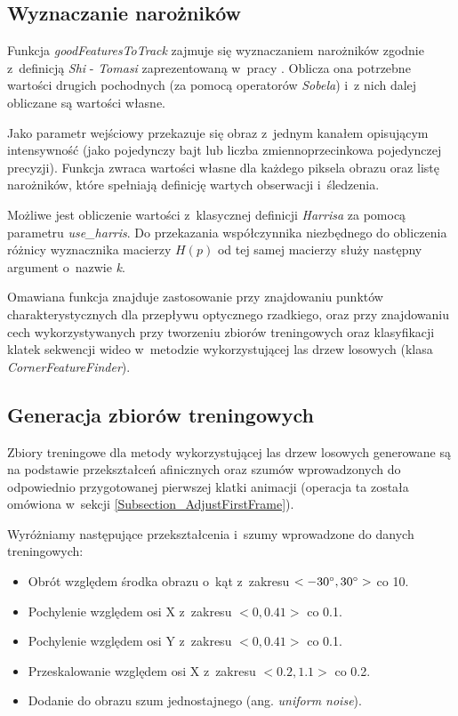   \subsection{Wyznaczanie narożników}
  Funkcja \textit{goodFeaturesToTrack} zajmuje się wyznaczaniem narożników zgodnie z~definicją \textit{Shi} - \textit{Tomasi} zaprezentowaną w~pracy \cite{GoodFeaturesToTrack94}. Oblicza ona potrzebne wartości drugich pochodnych (za pomocą operatorów \textit{Sobela}) i~z nich dalej obliczane są wartości własne.

  Jako parametr wejściowy przekazuje się obraz z~jednym kanałem opisującym intensywność (jako pojedynczy bajt lub liczba zmiennoprzecinkowa pojedynczej precyzji). Funkcja zwraca wartości własne dla każdego piksela obrazu oraz listę narożników, które spełniają definicję wartych obserwacji i~śledzenia.

  Możliwe jest obliczenie wartości z~klasycznej definicji \textit{Harrisa} za pomocą parametru \textit{use\_harris}. Do przekazania współczynnika niezbędnego do obliczenia różnicy wyznacznika macierzy $H(p)$ od tej samej macierzy służy następny argument o~nazwie \textit{k}.

  Omawiana funkcja znajduje zastosowanie przy znajdowaniu punktów charakterystycznych dla przepływu optycznego rzadkiego, oraz przy znajdowaniu cech wykorzystywanych przy tworzeniu zbiorów treningowych oraz klasyfikacji klatek sekwencji wideo w~metodzie wykorzystującej las drzew losowych (klasa \textit{CornerFeatureFinder}).

  \subsection{Generacja zbiorów treningowych}
  Zbiory treningowe dla metody wykorzystującej las drzew losowych generowane są na podstawie przekształceń afinicznych oraz szumów wprowadzonych do odpowiednio przygotowanej pierwszej klatki animacji (operacja ta została omówiona w~sekcji \ref{Subsection_AdjustFirstFrame}).

  Wyróżniamy następujące przekształcenia i~szumy wprowadzone do danych treningowych:

  \begin{itemize}
    \item Obrót względem środka obrazu o~kąt z~zakresu $<-30^{\circ}\protect, 30^{\circ}\protect>$ co 10\degree.
    \item Pochylenie względem osi X z~zakresu $<0, 0.41>$ co 0.1.
    \item Pochylenie względem osi Y z~zakresu $<0, 0.41>$ co 0.1.
    \item Przeskalowanie względem osi X z~zakresu $<0.2, 1.1>$ co 0.2.
    \item Dodanie do obrazu szum jednostajnego (ang. \textit{uniform noise}).
  \end{itemize}

